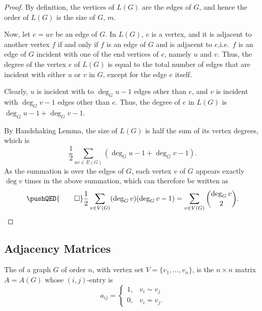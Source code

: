 \begin{proof}
By definition, the vertices of $L(G)$ are the edges of $G$, and hence the order of $L(G)$ is the size of $G$, $m$.

Now, let $e = uv$ be an edge of $G$. In $L(G)$, $e$ is a vertex, and it is adjacent to another vertex $f$ if and only if $f$ is an edge of $G$ and is adjacent to $e$,i.e.\ $f$ is an edge of $G$ incident with one of the end vertices of $e$, namely $u$ and $v$. Thus, the degree of the vertex $e$ of $L(G)$ is equal to the total number of edges that are incident with either $u$ or $v$ in $G$, except for the edge $e$ itself.

Clearly, $u$ is incident with to $\deg_G u - 1$ edges other than $e$, and $v$ is incident with $\deg_G v - 1$ edges other than $e$. Thus, the degree of $e$ in $L(G)$ is $\deg_G u  - 1 + \deg_G v - 1$.

By Handshaking Lemma, the size of $L(G)$ is half the sum of its vertex degrees, which is
\begin{equation*}
	\frac 1 2 \sum_{uv \in E(G)} (\deg_G u - 1 + \deg_G v - 1).
\end{equation*}
As the summation is over the edges of $G$, each vertex $v$ of $G$ appears exactly $\deg v$ times in the above summation, which can therefore be written as
\begin{equation*}
	\pushQED{\qed}
	\frac 1 2 \sum_{v \in V(G)} (\deg_G v)(\deg_G v - 1) = \sum_{v \in V(G)} \binom{\deg_G v}{2}.\qedhere
\end{equation*}
\end{proof}

\fi

\subsection{Adjacency Matrices}\label{subsec:AdjMat}

The  of a graph $G$ of order $n$, with vertex set $V = \{v_1, \ldots, v_n\}$, is the $n \times n$ matrix $A = A(G)$ whose $(i,j)$-entry is
\begin{equation*}
a_{ij} = \begin{cases}
1, & v_i \sim v_j \\
0, & v_i \nsim v_j.
\end{cases}
\end{equation*}

